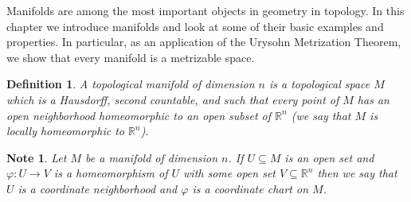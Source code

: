 \documentclass[11pt, letterpaper, oneside]{report}
\theoremstyle{pplain}
\newtheorem{ITERMVALUE THM}[theorem]{Intermediate Value Theorem}
\newtheorem{HEINEBOREL THM}[theorem]{Heine-Borel Theorem}
\newtheorem{UMETR THM}[theorem]{Urysohn Metrization Theorem}
\newtheorem{UMETR2 THM}[theorem]{Urysohn Metrization Theorem (v.2)}
\theoremstyle{ddefinition}
\newtheorem{definition}[theorem]{Definition}
\newtheorem{note}[theorem]{Note}
\theoremstyle{nnn}
\newtheorem{TDA NN}[theorem]{Topological Data Analysis. }
\theoremstyle{eexercise}
\newcommand{\R}{{\mathbb R}}
\begin{document}
\thispagestyle{firststyle}


Manifolds are among the most important objects  in geometry in topology. 
In this chapter we introduce manifolds and look at some of their basic examples and properties. 
In particular, as an application of  the Urysohn Metrization Theorem, we show that every manifold 
is a metrizable space. 

\begin{definition}
\label{MANIFOLD DEF}
A \emph{topological manifold of dimension $n$} is a topological space $M$
which is a Hausdorff, second countable, and such that
every point of $M$ has an open neighborhood  homeomorphic to an 
open subset of $\R^{n}$ (we say that $M$ is \emph{locally homeomorphic} to $\R^{n}$). 
\end{definition}

\begin{note}
Let $M$ be a manifold of dimension $n$. If $U\subseteq M$ is an open set and  $\varphi\colon U \to V$
is a homeomorphism of $U$ with some open set $V\subseteq \R^{n}$ then we say that  
$U$ is a \emph{coordinate neighborhood} and  $\varphi$ is 
a \emph{coordinate chart} on $M$.  
\end{note}
\end{document}
